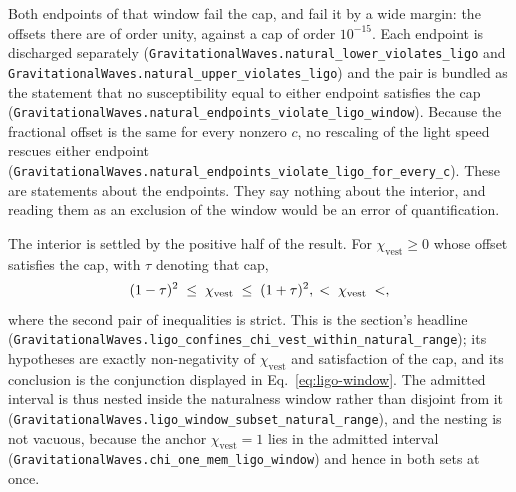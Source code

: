 \documentclass[aps,prd,nofootinbib,superscriptaddress,12pt]{revtex4-2}
\DeclareRobustCommand{\lb}{\discretionary{}{}{}}
\begin{document}
Both endpoints of that window fail the cap, and fail it by a wide margin:
the offsets there are of order unity, against a cap of order
$10^{-15}$. Each endpoint is discharged separately
(\texttt{Gravitational\lb{}Waves.\lb{}natural\_\lb{}lower\_\lb{}violates\_\lb{}ligo} and
\texttt{Gravitational\lb{}Waves.\lb{}natural\_\lb{}upper\_\lb{}violates\_\lb{}ligo}) and the pair
is bundled as the statement that no susceptibility equal to either
endpoint satisfies the cap
(\texttt{Gravitational\lb{}Waves.\lb{}natural\_\lb{}endpoints\_\lb{}violate\_\lb{}ligo\_\lb{}window}).
Because the fractional offset is the same for every nonzero $c$, no
rescaling of the light speed rescues either endpoint
(\texttt{Gravitational\lb{}Waves.\lb{}natural\_\lb{}endpoints\_\lb{}violate\_\lb{}ligo\_\lb{}for\_\lb{}every\_\lb{}c}).
These are statements about the endpoints. They say nothing about the
interior, and reading them as an exclusion of the window would be an
error of quantification.

The interior is settled by the positive half of the result. For
$\chi_{\mathrm{vest}} \ge 0$ whose offset satisfies the cap, with
$\tau$ denoting that cap,
\begin{equation}
\label{eq:ligo-window}
(1-\tau)^2 \;\le\; \chi_{\mathrm{vest}} \;\le\; (1+\tau)^2 ,
\qquad
\unskip
\;<\; \chi_{\mathrm{vest}} \;<\;
\unskip ,
\end{equation}
\noindent
where the second pair of inequalities is strict. This is the section's
headline
(\texttt{Gravitational\lb{}Waves.\lb{}ligo\_\lb{}confines\_\lb{}chi\_\lb{}vest\_\lb{}within\_\lb{}natural\_\lb{}range});
its hypotheses are exactly non-negativity of $\chi_{\mathrm{vest}}$ and
satisfaction of the cap, and its conclusion is the conjunction displayed
in Eq.~\eqref{eq:ligo-window}. The admitted interval is thus nested
inside the naturalness window rather than disjoint from it
(\texttt{Gravitational\lb{}Waves.\lb{}ligo\_\lb{}window\_\lb{}subset\_\lb{}natural\_\lb{}range}), and
the nesting is not vacuous, because the anchor $\chi_{\mathrm{vest}} = 1$
lies in the admitted interval
(\texttt{Gravitational\lb{}Waves.\lb{}chi\_\lb{}one\_\lb{}mem\_\lb{}ligo\_\lb{}window}) and hence in
both sets at once.
\end{document}
